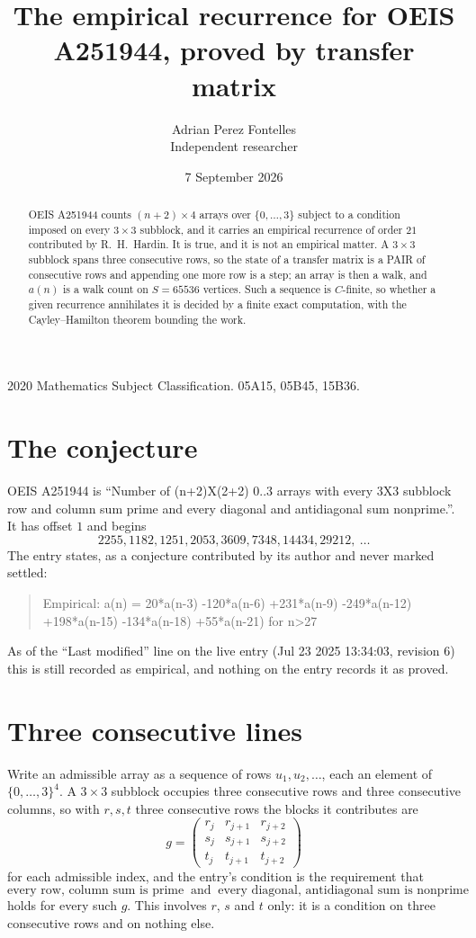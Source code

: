 \documentclass[11pt,a4paper]{article}
\title{The empirical recurrence for OEIS A251944, proved by transfer matrix}
\author{Adrian Perez Fontelles\\ \small Independent researcher}
\date{7 September 2026}
\theoremstyle{plain}
\theoremstyle{definition}
\begin{document}
\maketitle

\begin{abstract}
OEIS A251944 counts $(n+2)\times4$ arrays over $\{0,\dots,3\}$ subject to a condition imposed on
every $3\times3$ subblock, and it carries an empirical recurrence of order $21$
contributed by R.~H.~Hardin. It is true, and it is not an empirical matter. A $3\times3$
subblock spans three consecutive rows, so the state of a transfer matrix is a PAIR of
consecutive rows and appending one more row is a step; an array is then a walk, and
$a(n)$ is a walk count on $S=65536$ vertices. Such a sequence is $C$-finite, so whether a given
recurrence annihilates it is decided by a finite exact computation, with the Cayley--Hamilton
theorem bounding the work.
\end{abstract}

\noindent\small 2020 Mathematics Subject Classification. 05A15, 05B45, 15B36.\normalsize

\section{The conjecture}

OEIS A251944 is ``Number of (n+2)X(2+2) 0..3 arrays with every 3X3 subblock row and column sum prime and every diagonal and antidiagonal sum nonprime.''. It has offset $1$ and begins
\[
2255, 1182, 1251, 2053, 3609, 7348, 14434, 29212,\ \dots
\]
The entry states, as a conjecture contributed by its author and never marked settled:
\begin{quote}
Empirical: a(n) = 20*a(n-3) -120*a(n-6) +231*a(n-9) -249*a(n-12) +198*a(n-15) -134*a(n-18) +55*a(n-21) for n>27
\end{quote}
As of the ``Last modified'' line on the live entry (Jul 23 2025 13:34:03, revision 6) this is still
recorded as empirical, and nothing on the entry records it as proved.

\section{Three consecutive lines}

Write an admissible array as a sequence of rows $u_1,u_2,\dots$, each an element of
$\{0,\dots,3\}^{4}$. A $3\times3$ subblock occupies three consecutive rows and
three consecutive columns, so with $r,s,t$ three consecutive rows the blocks it
contributes are
\[
g=\begin{pmatrix}r_j&r_{j+1}&r_{j+2}\\ s_j&s_{j+1}&s_{j+2}\\ t_j&t_{j+1}&t_{j+2}\end{pmatrix}
\]
for each admissible index, and the entry's condition is the requirement that
\[
\text{every row, column sum is prime}\ \text{ and }\ \text{every diagonal, antidiagonal sum is nonprime}
\]
holds for every such $g$. This involves $r$, $s$ and $t$ only: it is a condition on
three consecutive rows and on nothing else.
\end{document}
